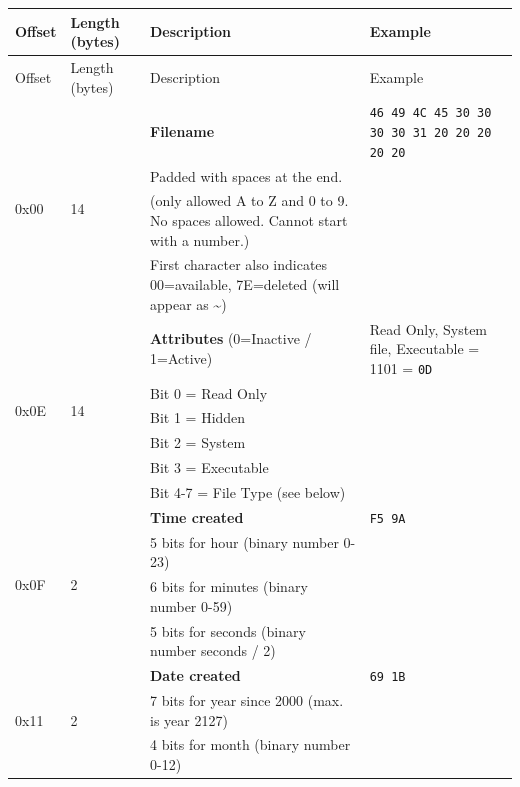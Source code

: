 \documentclass[a4paper,11pt]{article}
\begin{document}
        \begin{longtable}{ |m{1cm}|m{1.3cm}|m{6.8cm}|m{2.7cm}| }
            \hline
            \rowcolor{lightgray}
            Offset & Length (bytes) & Description & Example\\
            \hline
            \endfirsthead

            \hline
            \rowcolor{lightgray}
            Offset & Length (bytes) & Description & Example\\
            \hline
            \endhead

            \multirow{4}{4em}{0x00} & \multirow{4}{4em}{14} & \textbf{Filename}
            & \texttt{46 49 4C 45 30 30 30 30 31 20 20 20 20 20}\\
            & & Padded with spaces at the end. &\\
            & & (only allowed A to Z and 0 to 9. No spaces allowed. Cannot start
            with a number.) &\\
            & & First character also indicates 00=available, 7E=deleted (will
            appear as \textasciitilde) &\\
            \hline
            \multirow{6}{4em}{0x0E} & \multirow{6}{4em}{14} & \textbf{Attributes} (0=Inactive / 1=Active) 
            & Read Only, System file, Executable = 1101 = \texttt{0D}\\
            & & Bit 0 = Read Only &\\
            & & Bit 1 = Hidden &\\
            & & Bit 2 = System &\\
            & & Bit 3 = Executable &\\
            & & Bit 4-7 = File Type (see below) &\\
            \hline
            \multirow{4}{4em}{0x0F} & \multirow{4}{4em}{2} & \textbf{Time created}
            & \texttt{F5 9A}\\
            & & 5 bits for hour (binary number 0-23) &\\
            & & 6 bits for minutes (binary number 0-59) &\\
            & & 5 bits for seconds (binary number seconds / 2) &\\
            \hline
            \multirow{4}{4em}{0x11} & \multirow{4}{4em}{2} & \textbf{Date created}
            & \texttt{69 1B}\\
            & & 7 bits for year since 2000 (max. is year 2127) &\\
            & & 4 bits for month (binary number 0-12) &\\

\end{longtable}
\end{document}
